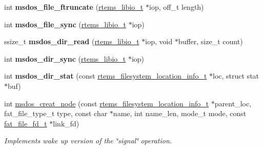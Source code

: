\begin{DoxyCompactItemize}
\item 
\mbox{\label{group__libfs__msdos_gab988027a698430053a983f08ba5f0afe}} 
int {\bfseries msdos\+\_\+file\+\_\+ftruncate} (\mbox{\hyperlink{structrtems__libio__tt}{rtems\+\_\+libio\+\_\+t}} $\ast$iop, off\+\_\+t length)
\item 
\mbox{\label{group__libfs__msdos_ga2af016a74130f438806ae52c8efa9bd1}} 
int {\bfseries msdos\+\_\+file\+\_\+sync} (\mbox{\hyperlink{structrtems__libio__tt}{rtems\+\_\+libio\+\_\+t}} $\ast$iop)
\item 
\mbox{\label{group__libfs__msdos_ga865b9d4a0051fc770283f7744620b74e}} 
ssize\+\_\+t {\bfseries msdos\+\_\+dir\+\_\+read} (\mbox{\hyperlink{structrtems__libio__tt}{rtems\+\_\+libio\+\_\+t}} $\ast$iop, void $\ast$buffer, size\+\_\+t count)
\item 
\mbox{\label{group__libfs__msdos_ga63b7829bebd2dc053d9c566be1446e32}} 
int {\bfseries msdos\+\_\+dir\+\_\+sync} (\mbox{\hyperlink{structrtems__libio__tt}{rtems\+\_\+libio\+\_\+t}} $\ast$iop)
\item 
\mbox{\label{group__libfs__msdos_ga1cbd4f374073d0a815260815e72b5800}} 
int {\bfseries msdos\+\_\+dir\+\_\+stat} (const \mbox{\hyperlink{group__LibIO_ga3252b3d31ee3c49ffff0b7604a676864}{rtems\+\_\+filesystem\+\_\+location\+\_\+info\+\_\+t}} $\ast$loc, struct stat $\ast$buf)
\item 
int \mbox{\hyperlink{group__libfs__msdos_gad3c1d9f2798d77cb8ec96f313e56a785}{msdos\+\_\+creat\+\_\+node}} (const \mbox{\hyperlink{group__LibIO_ga3252b3d31ee3c49ffff0b7604a676864}{rtems\+\_\+filesystem\+\_\+location\+\_\+info\+\_\+t}} $\ast$parent\+\_\+loc, fat\+\_\+file\+\_\+type\+\_\+t type, const char $\ast$name, int name\+\_\+len, mode\+\_\+t mode, const \mbox{\hyperlink{group__libfs__ff_gaa53f9c544914509505e3cfbd3796f877}{fat\+\_\+file\+\_\+fd\+\_\+t}} $\ast$link\+\_\+fd)
\begin{DoxyCompactList}\small\item\em Implements wake up version of the \char`\"{}signal\char`\"{} operation. \end{DoxyCompactList}\item 
\mbox{\label{group__libfs__msdos_gaf96123d0753959b8074a6f794fc4f398}} 

\end{DoxyCompactItemize}
